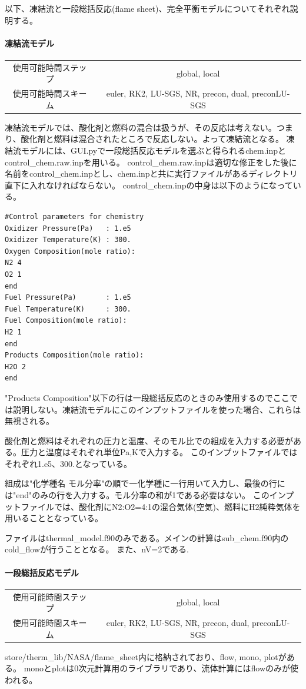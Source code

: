 \documentclass{jsarticle}
\begin{document}
\hspace{1em}

以下、凍結流と一段総括反応(flame sheet)、完全平衡モデルについてそれぞれ説明する。

\paragraph{凍結流モデル}%
\begin{center}
\begin{tabular}{c||c}\hline
使用可能時間ステップ & global, local\\
使用可能時間スキーム & euler, RK2, LU-SGS, NR, precon, dual, preconLU-SGS\\
\hline
\end{tabular}
\end{center}
凍結流モデルでは、酸化剤と燃料の混合は扱うが、その反応は考えない。つまり、酸化剤と燃料は混合されたところで反応しない。よって凍結流となる。
凍結流モデルには、GUI.pyで一段総括反応モデルを選ぶと得られるchem.inpとcontrol\_chem.raw.inpを用いる。
control\_chem.raw.inpは適切な修正をした後に名前をcontrol\_chem.inpとし、chem.inpと共に実行ファイルがあるディレクトリ直下に入れなければならない。
control\_chem.inpの中身は以下のようになっている。
\begin{verbatim}
#Control parameters for chemistry
Oxidizer Pressure(Pa)   : 1.e5
Oxidizer Temperature(K) : 300.
Oxygen Composition(mole ratio):
N2 4
O2 1
end
Fuel Pressure(Pa)       : 1.e5
Fuel Temperature(K)     : 300.
Fuel Composition(mole ratio):
H2 1
end
Products Composition(mole ratio):
H2O 2
end
\end{verbatim}
"Products Composition"以下の行は一段総括反応のときのみ使用するのでここでは説明しない。凍結流モデルにこのインプットファイルを使った場合、これらは無視される。

酸化剤と燃料はそれぞれの圧力と温度、そのモル比での組成を入力する必要がある。圧力と温度はそれぞれ単位Pa,Kで入力する。
このインプットファイルではそれぞれ1.e5、300.となっている。

組成は"化学種名 モル分率"の順で一化学種に一行用いて入力し、最後の行には"end"のみの行を入力する。モル分率の和が1である必要はない。
このインプットファイルでは、酸化剤にN2:O2=4:1の混合気体(空気)、燃料にH2純粋気体を用いることとなっている。

ファイルはthermal\_model.f90のみである。メインの計算はsub\_chem.f90内のcold\_flowが行うこととなる。
また、nV=2である.
\paragraph{一段総括反応モデル}%
\begin{center}
\begin{tabular}{c||c}\hline
使用可能時間ステップ & global, local\\
使用可能時間スキーム & euler, RK2, LU-SGS, NR, precon, dual, preconLU-SGS\\
\hline
\end{tabular}
\end{center}
store/therm\_lib/NASA/flame\_sheet内に格納されており、flow, mono, plotがある。
monoとplotは0次元計算用のライブラリであり、流体計算にはflowのみが使われる。
\end{document}
